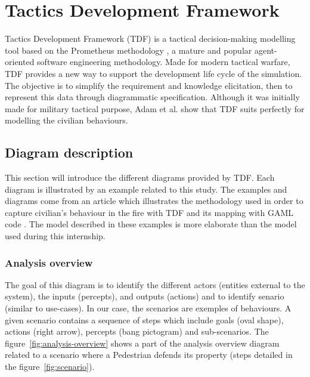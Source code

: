 \documentclass[12pt, a4paper]{memoir} %
\begin{document}
	\section{\label{sec:tdf}Tactics Development Framework}
		Tactics Development Framework (TDF) is a tactical decision-making modelling tool based on the Prometheus methodology \cite{evertsz2015},
		a mature and popular agent-oriented software engineering methodology.
		Made for modern tactical warfare, TDF provides a new way to support the development life cycle of the simulation. The objective
		is to simplify the requirement and knowledge elicitation, then to represent this data through diagrammatic specification.
		Although it was initially made for military tactical purpose, Adam et al. \cite{adam2015} show that TDF suits perfectly for modelling
		the civilian behaviours.

		\subsection{Diagram description}

			This section will introduce the different diagrams provided by TDF. Each diagram is illustrated by an example related to this
			study. The examples and diagrams come from an article which illustrates the methodology used in order to capture civilian's behaviour
			in the fire with TDF and its mapping with GAML code \cite{adam2016}. The model described in these examples is more elaborate than the
			model used during this internship.

			\subsubsection{Analysis overview}

				The goal of this diagram is to identify the different actors (entities external to the system), the inputs (percepts),
				and outputs (actions) and to identify senario (similar to use-cases). In our case,
				the scenarios are exemples of behaviours. A given scenario contains a sequence of steps which include goals (oval shape),
				actions (right arrow), percepts (bang pictogram) and sub-scenarios. The figure~\ref{fig:analysis-overview} shows a part of the
				analysis overview diagram related to a scenario where a Pedestrian defends its property (steps detailed in the figure~\ref{fig:scenario}).
\end{document}
